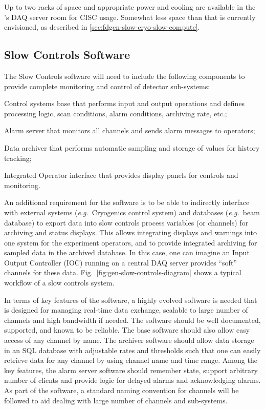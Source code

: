 Up to two racks of space and appropriate power and cooling are
available in the 's DAQ server room for CISC usage.
Somewhat less space than that is currently envisioned, as described in
\ref{sec:fdgen-slow-cryo-slow-compute}.

\subsection{Slow Controls Software}
\label{sec:fdgen-slow-cryo-sw}


The Slow Controls software will need to include the following components
to provide complete monitoring and control of detector sub-systems:
%
\begin{description}
 \item{Control systems base} that performs input and output operations
  and defines processing logic, scan conditions, alarm conditions,
  archiving rate, etc.;
 \item{Alarm server} that monitors all channels and sends alarm
  messages to operators; 
 \item{Data archiver} that performs automatic sampling and storage of
  values for history tracking;
 \item{Integrated Operator interface} that provides display panels for
  controls and monitoring.
\end{description}

An additional requirement for the software is to be able to indirectly
interface with external systems ({\em e.g.}\ Cryogenics control
system) and databases ({\em e.g.}\ beam database) to export data into
slow controls process variables (or channels) for archiving and status
displays. This allows integrating displays and warnings into one
system for the experiment operators, and to provide integrated
archiving for sampled data in the archived database. In this case, one
can imagine an Input Output Controller (IOC) running on a central DAQ
server provides ``soft'' channels for these data.
Fig.\ \ref{fig:gen-slow-controls-diagram} shows a typical workflow of a
slow controls system.

In terms of key features of the software, a highly evolved software is
needed that is designed for managing real-time data exchange, scalable
to large number of channels and high bandwidth if needed. The software
should be well documented, supported, and known to be reliable. The base
software should also allow easy access of any channel by name. The
archiver software should allow data storage in an SQL database with
adjustable rates and thresholds such that one can easily retrieve data
for any channel by using channel name and time range. Among the key
features, the alarm server software should remember state, support
arbitrary number of clients and provide logic for delayed alarms and
acknowledging alarms. As part of the software, a standard naming
convention for channels will be followed to aid dealing with large
number of channels and sub-systems.



